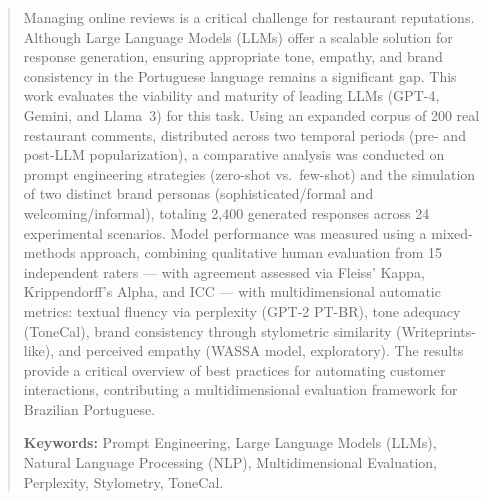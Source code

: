 
\begin{abstract}
Managing online reviews is a critical challenge for restaurant reputations. Although Large Language Models (LLMs) offer a scalable solution for response generation, ensuring appropriate tone, empathy, and brand consistency in the Portuguese language remains a significant gap. This work evaluates the viability and maturity of leading LLMs (GPT-4, Gemini, and Llama~3) for this task. Using an expanded corpus of 200 real restaurant comments, distributed across two temporal periods (pre- and post-LLM popularization), a comparative analysis was conducted on prompt engineering strategies (zero-shot vs.\ few-shot) and the simulation of two distinct brand personas (sophisticated/formal and welcoming/informal), totaling 2,400 generated responses across 24 experimental scenarios. Model performance was measured using a mixed-methods approach, combining qualitative human evaluation from 15 independent raters --- with agreement assessed via Fleiss' Kappa, Krippendorff's Alpha, and ICC --- with multidimensional automatic metrics: textual fluency via perplexity (GPT-2 PT-BR), tone adequacy (ToneCal), brand consistency through stylometric similarity (Writeprints-like), and perceived empathy (WASSA model, exploratory). The results provide a critical overview of best practices for automating customer interactions, contributing a multidimensional evaluation framework for Brazilian Portuguese.

\textbf{Keywords:} Prompt Engineering, Large Language Models (LLMs), Natural Language Processing (NLP), Multidimensional Evaluation, Perplexity, Stylometry, ToneCal.
\end{abstract}


%
%


